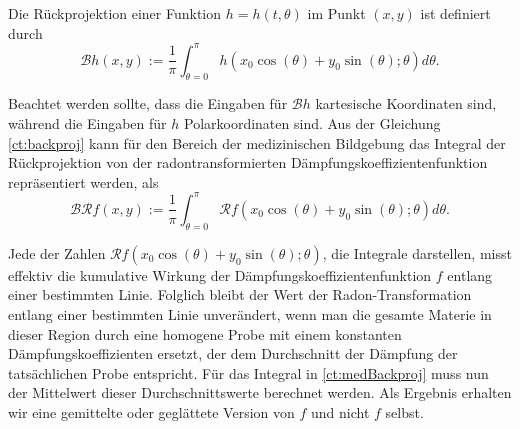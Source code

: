 Die Rückprojektion einer Funktion $h = h(t, \theta)$ im Punkt $(x, y)$ ist definiert durch
\begin{equation}\label{ct:backproj}
	\mathscr{B}h(x, y) := \dfrac{1}{\pi}\int_{\theta=0}^{\pi} h(x_0\cos(\theta) + y_0\sin(\theta); \theta) d\theta.
\end{equation}

Beachtet werden sollte, dass die Eingaben für $\mathscr{B}h$ kartesische Koordinaten sind, während die Eingaben für $h$ Polarkoordinaten sind.
Aus der Gleichung \ref{ct:backproj} kann für den Bereich der medizinischen Bildgebung das Integral der Rückprojektion von der radontransformierten Dämpfungskoeffizientenfunktion repräsentiert werden, als
\begin{equation}\label{ct:medBackproj}
	\mathscr{B}\mathscr{R}f(x, y) := \dfrac{1}{\pi}\int_{\theta=0}^{\pi} \mathscr{R}f(x_0\cos(\theta) + y_0\sin(\theta); \theta) d\theta.
\end{equation}

Jede der Zahlen $\mathscr{R}f(x_0\cos(\theta) + y_0\sin(\theta); \theta)$, die Integrale darstellen, misst effektiv die kumulative Wirkung der Dämpfungskoeffizientenfunktion $f$ entlang einer bestimmten Linie. Folglich bleibt der Wert der Radon-Transformation entlang einer bestimmten Linie unverändert, wenn man die gesamte Materie in dieser Region durch eine homogene Probe mit einem konstanten Dämpfungskoeffizienten ersetzt, der dem Durchschnitt der Dämpfung der tatsächlichen Probe entspricht. Für das Integral in \ref{ct:medBackproj} muss nun der Mittelwert dieser Durchschnittswerte berechnet werden. Als Ergebnis erhalten wir eine \glqq gemittelte\grqq{} oder \glqq geglättete\grqq{} Version von $f$ und nicht $f$ selbst.

